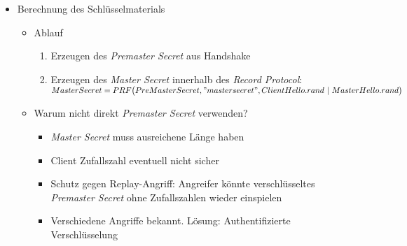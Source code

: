 \begin{description}
\begin{itemize}
		\item Berechnung des Schlüsselmaterials
		\begin{itemize}
			\item Ablauf
			\begin{enumerate}
				\item Erzeugen des \textit{Premaster Secret} aus Handshake
				\item Erzeugen des \textit{Master Secret} innerhalb des \textit{Record Protocol}:\newline\(MasterSecret = PRF\big(PreMasterSecret,"master secret", ClientHello.rand~|~MasterHello.rand\big)\)
			\end{enumerate}
			\item Warum nicht direkt \textit{Premaster Secret} verwenden?
			\begin{itemize}
				\item \textit{Master Secret} muss ausreichene Länge haben
				\item Client Zufallszahl eventuell nicht sicher
				\item Schutz gegen Replay-Angriff: Angreifer könnte verschlüsseltes \textit{Premaster Secret} ohne Zufallszahlen wieder einspielen
				\item Verschiedene Angriffe bekannt. Lösung: Authentifizierte Verschlüsselung
			\end{itemize}
		\end{itemize}
	\end{itemize}
\end{description}


